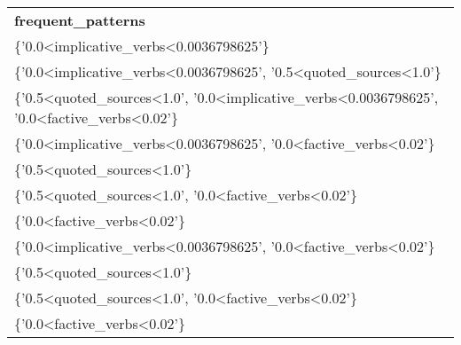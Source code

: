 \begin{tabular}{ll}
\multicolumn{2}{l}{\textbf{frequent\_patterns}}                                                                                                                                   \\
\multicolumn{2}{l}{\{'0.0\textless{}implicative\_verbs\textless{}0.0036798625'\}}                                                                                                 \\
\multicolumn{2}{l}{\{'0.0\textless{}implicative\_verbs\textless{}0.0036798625',   '0.5\textless{}quoted\_sources\textless{}1.0'\}}                                                \\
\multicolumn{2}{l}{\{'0.5\textless{}quoted\_sources\textless{}1.0',   '0.0\textless{}implicative\_verbs\textless{}0.0036798625', '0.0\textless{}factive\_verbs\textless{}0.02'\}} \\
\multicolumn{2}{l}{\{'0.0\textless{}implicative\_verbs\textless{}0.0036798625',   '0.0\textless{}factive\_verbs\textless{}0.02'\}}                                                \\
\multicolumn{2}{l}{\{'0.5\textless{}quoted\_sources\textless{}1.0'\}}                                                                                                             \\
\multicolumn{2}{l}{\{'0.5\textless{}quoted\_sources\textless{}1.0',   '0.0\textless{}factive\_verbs\textless{}0.02'\}}                                                            \\
\multicolumn{2}{l}{\{'0.0\textless{}factive\_verbs\textless{}0.02'\}}                                                                                                             \\
\multicolumn{2}{l}{\{'0.0\textless{}implicative\_verbs\textless{}0.0036798625',   '0.0\textless{}factive\_verbs\textless{}0.02'\}}                                                \\
\multicolumn{2}{l}{\{'0.5\textless{}quoted\_sources\textless{}1.0'\}}                                                                                                             \\
\multicolumn{2}{l}{\{'0.5\textless{}quoted\_sources\textless{}1.0',   '0.0\textless{}factive\_verbs\textless{}0.02'\}}                                                            \\
\multicolumn{2}{l}{\{'0.0\textless{}factive\_verbs\textless{}0.02'\}}                                                                                                            
\end{tabular}